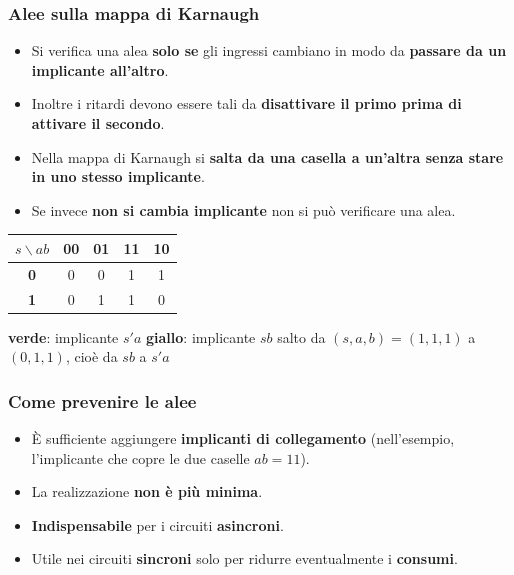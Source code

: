\documentclass[12pt, a4paper]{article}
\begin{document}
\subsubsection{Alee sulla mappa di Karnaugh}

\begin{itemize}
    \item Si verifica una alea \textbf{solo se} gli ingressi cambiano in modo da \textbf{passare da un implicante all'altro}.
    \item Inoltre i ritardi devono essere tali da \textbf{disattivare il primo prima di attivare il secondo}.
    \item Nella mappa di Karnaugh si \textbf{salta da una casella a un'altra senza stare in uno stesso implicante}.
    \item Se invece \textbf{non si cambia implicante} non si può verificare una alea.
\end{itemize}

\begin{center}
\renewcommand{\arraystretch}{1.25}
\begin{tabular}[t]{|c|c|c|c|c|}
\hline
\colorbox{gray!25}{\color{black}$s\backslash ab$} & \colorbox{gray!25}{\color{black}\textbf{00}} & \colorbox{gray!25}{\color{black}\textbf{01}} & \colorbox{gray!25}{\color{black}\textbf{11}} & \colorbox{gray!25}{\color{black}\textbf{10}} \\ \hline
\colorbox{gray!25}{\color{black}\textbf{0}} & 0 & 0 & \colorbox{green!30}{\color{black}1} & \colorbox{green!30}{\color{black}1} \\ \hline
\colorbox{gray!25}{\color{black}\textbf{1}} & 0 & \colorbox{yellow!55}{\color{black}1} & \colorbox{yellow!55}{\color{black}1} & 0 \\ \hline
\end{tabular}
\end{center}
\begin{center}
\textcolor{green!50!black}{\textbf{verde}}: implicante $s'a$ \qquad \textcolor{yellow!50!black}{\textbf{giallo}}: implicante $sb$ \qquad salto da $(s,a,b) = (1,1,1)$ a $(0,1,1)$, cioè da $sb$ a $s'a$
\end{center}

\subsubsection{Come prevenire le alee}

\begin{itemize}
    \item È sufficiente aggiungere \textbf{implicanti di collegamento} (nell'esempio, l'implicante che copre le due caselle $ab = 11$).
    \item La realizzazione \textbf{non è più minima}.
    \item \textbf{Indispensabile} per i circuiti \textbf{asincroni}.
    \item Utile nei circuiti \textbf{sincroni} solo per ridurre eventualmente i \textbf{consumi}.
\end{itemize}
\end{document}
